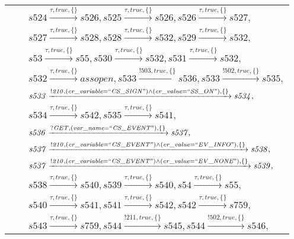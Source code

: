 \begin{tabular}{lcl}
& & $\mathit{s524}\xrightarrow{\mathit{\tau}, \mathit{true}, \{\}}\mathit{s526},\mathit{s525}\xrightarrow{\mathit{\tau}, \mathit{true}, \{\}}\mathit{s526},\mathit{s526}\xrightarrow{\mathit{\tau}, \mathit{true}, \{\}}\mathit{s527},$ \\
& & $\mathit{s527}\xrightarrow{\mathit{\tau}, \mathit{true}, \{\}}\mathit{s528},\mathit{s528}\xrightarrow{\mathit{\tau}, \mathit{true}, \{\}}\mathit{s532},\mathit{s529}\xrightarrow{\mathit{\tau}, \mathit{true}, \{\}}\mathit{s532},$ \\
& & $\mathit{s53}\xrightarrow{\mathit{\tau}, \mathit{true}, \{\}}\mathit{s55},\mathit{s530}\xrightarrow{\mathit{\tau}, \mathit{true}, \{\}}\mathit{s532},\mathit{s531}\xrightarrow{\mathit{\tau}, \mathit{true}, \{\}}\mathit{s532},$ \\
& & $\mathit{s532}\xrightarrow{\mathit{\tau}, \mathit{true}, \{\}}\mathit{assopen},\mathit{s533}\xrightarrow{\mathit{!503}, \mathit{true}, \{\}}\mathit{s536},\mathit{s533}\xrightarrow{\mathit{!502}, \mathit{true}, \{\}}\mathit{s535},$ \\
& & $\mathit{s533}\xrightarrow{\mathit{!210}, \mathit{(cr\_variable = ``CS\_SIGN") \land (cr\_value = ``SS\_ON")}, \{\}}\mathit{s534},$ \\
& & $\mathit{s534}\xrightarrow{\mathit{\tau}, \mathit{true}, \{\}}\mathit{s542},\mathit{s535}\xrightarrow{\mathit{\tau}, \mathit{true}, \{\}}\mathit{s541},$ \\
& & $\mathit{s536}\xrightarrow{\mathit{?GET}, \mathit{(var\_name = ``CS\_EVENT")}, \{\}}\mathit{s537},$ \\
& & $\mathit{s537}\xrightarrow{\mathit{!210}, \mathit{(cr\_variable = ``CS\_EVENT") \land (cr\_value = ``EV\_INFO")}, \{\}}\mathit{s538},$ \\
& & $\mathit{s537}\xrightarrow{\mathit{!210}, \mathit{(cr\_variable = ``CS\_EVENT") \land (cr\_value = ``EV\_NONE")}, \{\}}\mathit{s539},$ \\
& & $\mathit{s538}\xrightarrow{\mathit{\tau}, \mathit{true}, \{\}}\mathit{s540},\mathit{s539}\xrightarrow{\mathit{\tau}, \mathit{true}, \{\}}\mathit{s540},\mathit{s54}\xrightarrow{\mathit{\tau}, \mathit{true}, \{\}}\mathit{s55},$ \\
& & $\mathit{s540}\xrightarrow{\mathit{\tau}, \mathit{true}, \{\}}\mathit{s541},\mathit{s541}\xrightarrow{\mathit{\tau}, \mathit{true}, \{\}}\mathit{s542},\mathit{s542}\xrightarrow{\mathit{\tau}, \mathit{true}, \{\}}\mathit{s759},$ \\
& & $\mathit{s543}\xrightarrow{\mathit{\tau}, \mathit{true}, \{\}}\mathit{s759},\mathit{s544}\xrightarrow{\mathit{!211}, \mathit{true}, \{\}}\mathit{s545},\mathit{s544}\xrightarrow{\mathit{!502}, \mathit{true}, \{\}}\mathit{s546},$ \\

\end{tabular}
